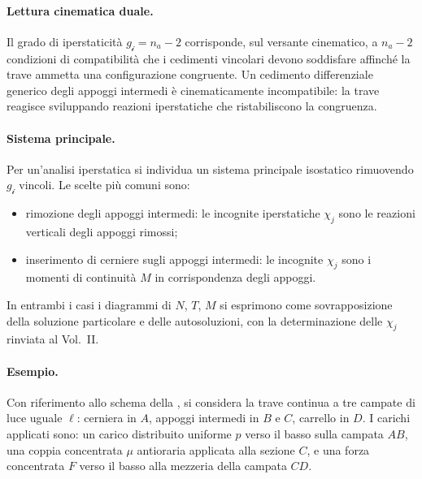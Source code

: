 \paragraph{Lettura cinematica duale.}
Il grado di iperstaticità $g_{\mathscr{i}} = n_a - 2$
corrisponde, sul versante cinematico, a $n_a - 2$
condizioni di compatibilità che i cedimenti vincolari
devono soddisfare affinché la trave ammetta una
configurazione congruente. Un cedimento differenziale
generico degli appoggi intermedi è cinematicamente
incompatibile: la trave reagisce sviluppando reazioni
iperstatiche che ristabiliscono la congruenza.

\paragraph{Sistema principale.}
Per un'analisi iperstatica si individua un sistema
principale isostatico rimuovendo $g_{\mathscr{i}}$
vincoli. Le scelte più comuni sono:
\begin{itemize}[noitemsep]
\item rimozione degli appoggi intermedi: le
incognite iperstatiche $\chi_j$ sono le reazioni
verticali degli appoggi rimossi;
\item inserimento di cerniere sugli appoggi
intermedi: le incognite $\chi_j$ sono i momenti
di continuità $M$ in corrispondenza degli appoggi.
\end{itemize}
In entrambi i casi i diagrammi di $N$, $T$, $M$ si
esprimono come sovrapposizione della soluzione
particolare e delle autosoluzioni, con la determinazione
delle $\chi_j$ rinviata al Vol.~II.



\paragraph{Esempio.}
\label{par:esempio_trave_continua}

Con riferimento allo schema della ,
si considera la trave continua a tre campate di luce uguale
$\ell$: cerniera in $A$, appoggi intermedi in $B$ e $C$,
carrello in $D$. I carichi applicati sono: un carico distribuito
uniforme $p$ verso il basso sulla campata $AB$,  una coppia concentrata $\mu$ antioraria
applicata alla sezione  $C$, e una forza concentrata $F$ verso il basso alla mezzeria
della campata $CD$.

